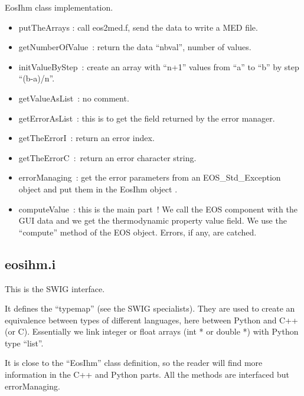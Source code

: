 \documentclass[10pt,a4paper]{article}
\begin{document}
EosIhm class implementation.

\begin{itemize}
\item putTheArrays : call eos2med.f, send the data to write a MED file.

\item getNumberOfValue : return the data ``nbval'', number of values.

\item initValueByStep : create an array with ``n+1'' values from ``a'' to ``b'' by step ``(b-a)/n''.

\item getValueAsList : no comment.

\item getErrorAsList : this is to get the field returned by the error manager.

\item getTheErrorI : return an error index.

\item getTheErrorC : return an error character string.

\item errorManaging : get the error parameters  from an  EOS\_Std\_Exception object and put them in the  EosIhm object .

\item computeValue : this is the main part ! We call the EOS component with the GUI data and we get the thermodynamic property value field. We use the ``compute'' method of the EOS object. Errors, if any, are catched.
\end{itemize}

\subsection{eosihm.i}

This is the SWIG interface.

It defines the  ``typemap'' (see the SWIG specialists). They are used to create an equivalence between types of different languages, here between Python and C++ (or C). Essentially we link integer or float arrays (int * or double *) with Python type ``list''.

It is close to the ``EosIhm'' class definition, so the reader will find more information in the C++ and Python parts. All the methods are interfaced but errorManaging.
\end{document}
